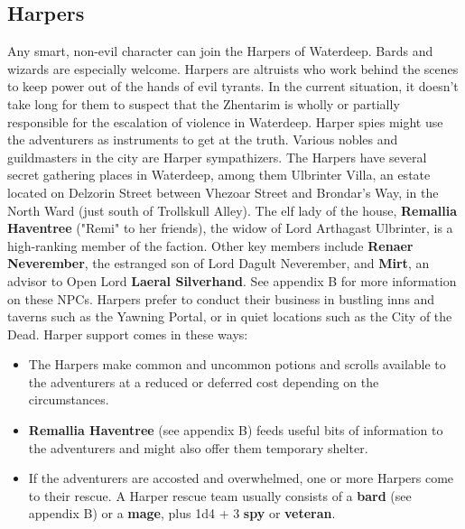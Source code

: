 \documentclass[10pt,a4paper,twoside,twocolumn,openany,nodeprecatedcode]{dndbook}
\begin{document}
\subsection{Harpers}
Any smart, non-evil character can join the Harpers of Waterdeep. Bards and wizards are especially welcome.
Harpers are altruists who work behind the scenes to keep power out of the hands of evil tyrants. In the current situation, it doesn't take long for them to suspect that the Zhentarim is wholly or partially responsible for the escalation of violence in Waterdeep. Harper spies might use the adventurers as instruments to get at the truth. Various nobles and guildmasters in the city are Harper sympathizers.
The Harpers have several secret gathering places in Waterdeep, among them Ulbrinter Villa, an estate located on Delzorin Street between Vhezoar Street and Brondar's Way, in the North Ward (just south of Trollskull Alley). The elf lady of the house, \textbf{Remallia Haventree} ("Remi" to her friends), the widow of Lord Arthagast Ulbrinter, is a high-ranking member of the faction. Other key members include \textbf{Renaer Neverember}, the estranged son of Lord Dagult Neverember, and \textbf{Mirt}, an advisor to Open Lord \textbf{Laeral Silverhand}. See appendix B for more information on these NPCs.
Harpers prefer to conduct their business in bustling inns and taverns such as the Yawning Portal, or in quiet locations such as the City of the Dead.
Harper support comes in these ways:
\begin{itemize}

\item The Harpers make common and uncommon potions and scrolls available to the adventurers at a reduced or deferred cost depending on the circumstances.
\item \textbf{Remallia Haventree} (see appendix B) feeds useful bits of information to the adventurers and might also offer them temporary shelter.
\item If the adventurers are accosted and overwhelmed, one or more Harpers come to their rescue. A Harper rescue team usually consists of a \textbf{bard} (see appendix B) or a \textbf{mage}, plus 1d4 + 3 \textbf{spy} or \textbf{veteran}.
\end{itemize}
\end{document}
